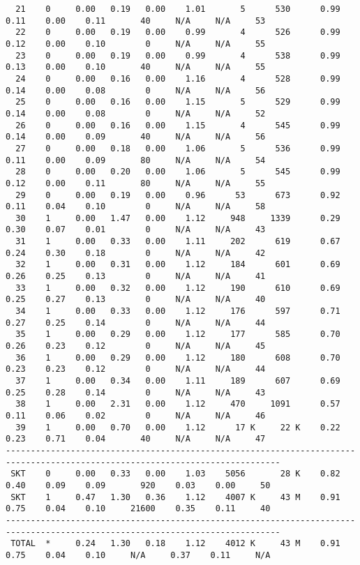 \begin{lstlisting}
  21    0     0.00   0.19   0.00    1.01       5      530      0.99    0.11    0.00    0.11       40     N/A     N/A     53
  22    0     0.00   0.19   0.00    0.99       4      526      0.99    0.12    0.00    0.10        0     N/A     N/A     55
  23    0     0.00   0.19   0.00    0.99       4      538      0.99    0.13    0.00    0.10       40     N/A     N/A     55
  24    0     0.00   0.16   0.00    1.16       4      528      0.99    0.14    0.00    0.08        0     N/A     N/A     56
  25    0     0.00   0.16   0.00    1.15       5      529      0.99    0.14    0.00    0.08        0     N/A     N/A     52
  26    0     0.00   0.16   0.00    1.15       4      545      0.99    0.14    0.00    0.09       40     N/A     N/A     56
  27    0     0.00   0.18   0.00    1.06       5      536      0.99    0.11    0.00    0.09       80     N/A     N/A     54
  28    0     0.00   0.20   0.00    1.06       5      545      0.99    0.12    0.00    0.11       80     N/A     N/A     55
  29    0     0.00   0.19   0.00    0.96      53      673      0.92    0.11    0.04    0.10        0     N/A     N/A     58
  30    1     0.00   1.47   0.00    1.12     948     1339      0.29    0.30    0.07    0.01        0     N/A     N/A     43
  31    1     0.00   0.33   0.00    1.11     202      619      0.67    0.24    0.30    0.18        0     N/A     N/A     42
  32    1     0.00   0.31   0.00    1.12     184      601      0.69    0.26    0.25    0.13        0     N/A     N/A     41
  33    1     0.00   0.32   0.00    1.12     190      610      0.69    0.25    0.27    0.13        0     N/A     N/A     40
  34    1     0.00   0.33   0.00    1.12     176      597      0.71    0.27    0.25    0.14        0     N/A     N/A     44
  35    1     0.00   0.29   0.00    1.12     177      585      0.70    0.26    0.23    0.12        0     N/A     N/A     45
  36    1     0.00   0.29   0.00    1.12     180      608      0.70    0.23    0.23    0.12        0     N/A     N/A     44
  37    1     0.00   0.34   0.00    1.11     189      607      0.69    0.25    0.28    0.14        0     N/A     N/A     43
  38    1     0.00   2.31   0.00    1.12     470     1091      0.57    0.11    0.06    0.02        0     N/A     N/A     46
  39    1     0.00   0.70   0.00    1.12      17 K     22 K    0.22    0.23    0.71    0.04       40     N/A     N/A     47
-----------------------------------------------------------------------------------------------------------------------------
 SKT    0     0.00   0.33   0.00    1.03    5056       28 K    0.82    0.40    0.09    0.09       920    0.03    0.00     50
 SKT    1     0.47   1.30   0.36    1.12    4007 K     43 M    0.91    0.75    0.04    0.10     21600    0.35    0.11     40
-----------------------------------------------------------------------------------------------------------------------------
 TOTAL  *     0.24   1.30   0.18    1.12    4012 K     43 M    0.91    0.75    0.04    0.10     N/A     0.37    0.11     N/A

\end{lstlisting}
